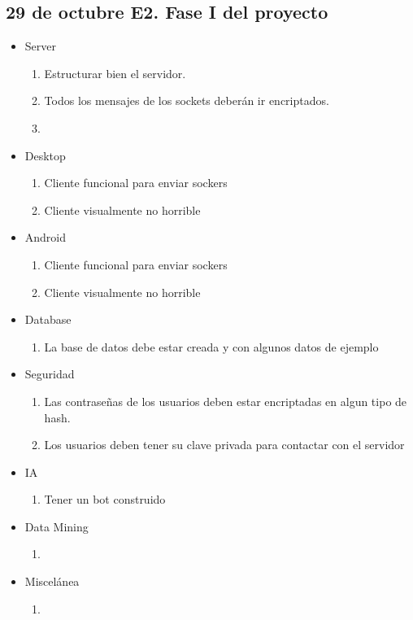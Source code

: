 \documentclass{article}
\theoremstyle{definition}
\begin{document}
\subsection{29 de octubre	E2. Fase I del proyecto}

\begin{itemize}
\item Server \begin{enumerate}
\item Estructurar bien el servidor.
\item Todos los mensajes de los sockets deberán ir encriptados.
\item 
\end{enumerate}
\item Desktop \begin{enumerate}
\item Cliente funcional para enviar sockers
\item Cliente visualmente no horrible
\end{enumerate}
\item Android \begin{enumerate}
\item Cliente funcional para enviar sockers
\item Cliente visualmente no horrible
\end{enumerate}
\item Database \begin{enumerate}
\item La base de datos debe estar creada y con algunos datos de ejemplo
\end{enumerate}
\item Seguridad \begin{enumerate}
\item Las contraseñas de los usuarios deben estar encriptadas en algun tipo de hash.
\item Los usuarios deben tener su clave privada para contactar con el servidor
\end{enumerate}
\item IA \begin{enumerate}
\item Tener un bot construido
\end{enumerate}
\item Data Mining \begin{enumerate}
\item
\end{enumerate}
\item Miscelánea \begin{enumerate}
\item 
\end{enumerate}

\end{itemize}
\end{document}
